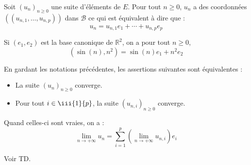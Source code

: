 \documentclass[french,11pt,twoside]{VcCours}
\begin{document}
Soit $(u_n)_{n \geq 0}$ une suite d'éléments de $E$. Pour tout $n \geq 0$, $u_n$ a des coordonnées $((u_{n,1}, \ldots, u_{n,p}))$ dans $\mathcal{B}$ ce qui est équivalent à dire que :
$$ u_n = u_{n,1} e_1 + \cdots + u_{n,p} e_p $$

\begin{Exemple} Si $(e_1,e_2)$ est la base canonique de $\mathbb{R}^2$, on a pour tout $n \geq 0$,
$$ (\sin(n),n^2) = \sin(n) e_1 + n^2e_2$$
\end{Exemple}

\begin{Theoreme}{} En gardant les notations précédentes, les assertions suivantes sont équivalentes :
\begin{itemize}
\item La suite $(u_n)_{n \geq 0}$ converge.
\item Pour tout $i \in \iii{1}{p}$, la suite $(u_{n,i})_{n \geq 0}$ converge.
\end{itemize}
Quand celles-ci sont vraies, on a :
$$ \lim_{n \rightarrow + \infty} u_n = \sum_{i=1}^p \left(\lim_{n \rightarrow + \infty} u_{n,i} \right) e_i $$
\end{Theoreme}

\begin{Demonstration}{} Voir TD.
\end{Demonstration}
\end{document}
